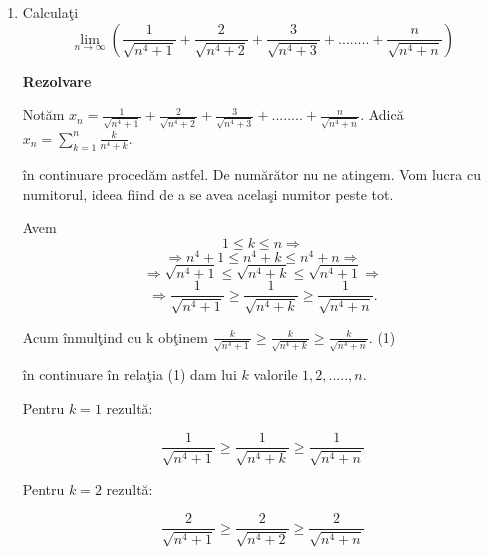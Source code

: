 \documentclass[a4paper,12pt,oneside]{report}
\begin{document}
\begin{enumerate}
 \item Calcula\c ti
\begin{displaymath}
   \lim_{n\to\infty }\left ( \frac{1}{\sqrt{n^{4}+1}}+ \frac{2}{\sqrt{n^{4}+2} } +\frac{3}{\sqrt{n^{4}+3}}+........+\frac{n}{\sqrt{n^{4}+n}}  \right )
\end{displaymath}


\textbf{Rezolvare}

Not\u am \( x_{n}= \frac{1}{\sqrt{n^{4}+1}} + \frac{2}{\sqrt{n^{4}+2}}+\frac{3}{\sqrt{n^{4}+3}}+........+\frac{n}{\sqrt{n^{4}+n}} \).
Adic\u a \( x_{n}= \sum_{k=1}^{n}\frac{k}{n^{4}+k}\).

\^ in continuare proced\u am astfel. De num\u ar\u ator nu ne atingem. Vom lucra cu numitorul, ideea fiind de a se avea acela\c si numitor peste tot. 

Avem 
\begin{displaymath}
  1\leq k\leq n \Rightarrow 
\end{displaymath}
\begin{displaymath}
  \Rightarrow  n^{4}+1 \leq n^{4}+k \leq n^{4}+n \Rightarrow 
\end{displaymath}
\begin{displaymath}
  \Rightarrow  \sqrt{n^{4}+1}\leq \sqrt{n^{4}+k}\leq \sqrt{n^{4}+1} \Rightarrow 
\end{displaymath}
\begin{displaymath}
  \Rightarrow  \frac{1}{\sqrt{n^{4}+1}}\geq \frac{1}{\sqrt{n^{4}+k}}\geq \frac{1}{\sqrt{n^{4}+n}}.
\end{displaymath}


Acum \^ inmul\c tind cu k ob\c tinem \(\frac{k}{\sqrt{n^{4}+1}}\geq \frac{k}{\sqrt{n^{4}+k}}\geq \frac{k}{\sqrt{n^{4}+n}}\). (1) 

\^ in continuare \^ in rela\c tia (1) dam lui \(k\) valorile \(1,2,.....,n\). 

Pentru \(k = 1\) rezult\u a:

\begin{displaymath}
  \frac{1}{\sqrt{n^{4}+1}}\geq \frac{1}{\sqrt{n^{4}+k}}\geq \frac{1}{\sqrt{n^{4}+n}} 
\end{displaymath}


Pentru \(k = 2\) rezult\u a:

\begin{displaymath}
  \frac{2}{\sqrt{n^{4}+1}}\geq \frac{2}{\sqrt{n^{4}+2}}\geq \frac{2}{\sqrt{n^{4}+n}}
\end{displaymath}



\end{enumerate}
\end{document}
